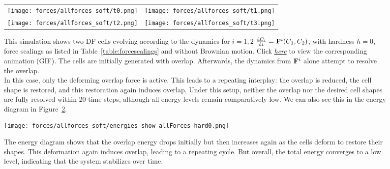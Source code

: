 \begin{figure}[h!]
    \centering
    \begin{tabular}{cc}
        \texttt{[image: forces/allforces\_soft/t0.png]} &
        \texttt{[image: forces/allforces\_soft/t1.png]} \\
        \texttt{[image: forces/allforces\_soft/t2.png]} &
        \texttt{[image: forces/allforces\_soft/t3.png]} \\
    \end{tabular}
    \caption{This simulation shows two DF cells evolving according to the dynamics for $i=1,2$ $\frac{\mathrm{d} C_i}{\mathrm{d} t} = \mathbf{F}^i(C_1, C_2)$, with hardness $h=0$, force 		scalings as listed in Table~\ref{table:forcescalings} and without Brownian motion.
			Click \href{https://github.com/tivo476c/FlexibleCellModel/blob/master/figures/gifs/showForces/show-allForces-soft.gif}{\textit{here}} to view the corresponding animation (GIF).
			The cells are initially generated with overlap. 
			Afterwards, the dynamics from $\mathbf{F}^i$ alone attempt to resolve the overlap.\\
			In this case, only the deforming overlap force is active. 
			This leads to a repeating interplay: the overlap is reduced, the cell shape is restored, and this restoration again induces overlap.
			Under this setup, neither the overlap nor the desired cell shapes are fully resolved within 20 time steps, although all energy levels remain comparatively low.
			We can also see this in the energy diagram in Figure~\ref{fig:allForces-softEnergyDiagram}.
			}
	\label{fig:allForces-soft}
\end{figure}
\begin{figure}[h!]
    \centering
        \texttt{[image: forces/allforces\_soft/energies-show-allForces-hard0.png]} 
    \caption{The energy diagram shows that the overlap energy drops initially but then increases again as the cells deform to restore their shapes.
			 This deformation again induces overlap, leading to a repeating cycle.
			 But overall, the total energy converges to a low level, indicating that the system stabilizes over time.} 
	\label{fig:allForces-softEnergyDiagram}    
\end{figure}



